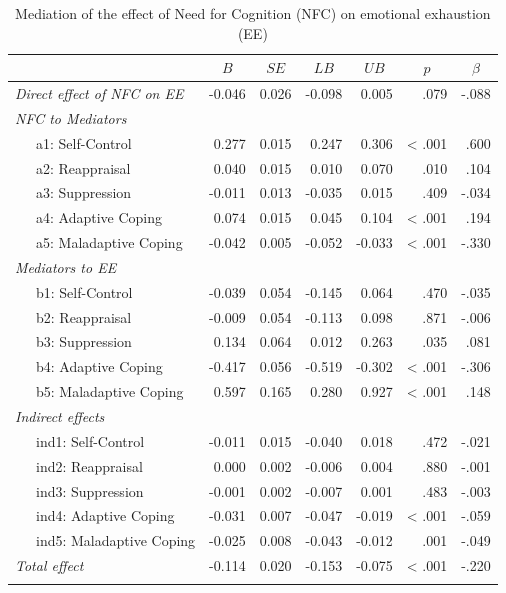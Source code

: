\documentclass[
  english,
  man]{apa6}
\begin{document}
\begin{table}[tbp]

\begin{center}
\begin{threeparttable}

\caption{\label{tab:RQ5}Mediation of the effect of Need for Cognition (NFC) on emotional exhaustion (EE)}

\footnotesize{

\begin{tabular}{lrrrrrr}
\toprule
 & \multicolumn{1}{c}{$B$} & \multicolumn{1}{c}{$SE$} & \multicolumn{1}{c}{$LB$} & \multicolumn{1}{c}{$UB$} & \multicolumn{1}{c}{$p$} & \multicolumn{1}{c}{$\beta$}\\
\midrule
\textit{Direct effect of NFC on EE} & -0.046 & 0.026 & -0.098 & 0.005 & .079 & -.088\\ \midrule
\textit{NFC to Mediators} &  &  &  &  &  & \\
\ \ \ a1: Self-Control & 0.277 & 0.015 & 0.247 & 0.306 & < .001 & .600\\
\ \ \ a2: Reappraisal & 0.040 & 0.015 & 0.010 & 0.070 & .010 & .104\\
\ \ \ a3: Suppression & -0.011 & 0.013 & -0.035 & 0.015 & .409 & -.034\\
\ \ \ a4: Adaptive Coping & 0.074 & 0.015 & 0.045 & 0.104 & < .001 & .194\\
\ \ \ a5: Maladaptive Coping & -0.042 & 0.005 & -0.052 & -0.033 & < .001 & -.330\\ \midrule
\textit{Mediators to EE} &  &  &  &  &  & \\
\ \ \ b1: Self-Control & -0.039 & 0.054 & -0.145 & 0.064 & .470 & -.035\\
\ \ \ b2: Reappraisal & -0.009 & 0.054 & -0.113 & 0.098 & .871 & -.006\\
\ \ \ b3: Suppression & 0.134 & 0.064 & 0.012 & 0.263 & .035 & .081\\
\ \ \ b4: Adaptive Coping & -0.417 & 0.056 & -0.519 & -0.302 & < .001 & -.306\\
\ \ \ b5: Maladaptive Coping & 0.597 & 0.165 & 0.280 & 0.927 & < .001 & .148\\ \midrule
\textit{Indirect effects} &  &  &  &  &  & \\
\ \ \ ind1: Self-Control & -0.011 & 0.015 & -0.040 & 0.018 & .472 & -.021\\
\ \ \ ind2: Reappraisal & 0.000 & 0.002 & -0.006 & 0.004 & .880 & -.001\\
\ \ \ ind3: Suppression & -0.001 & 0.002 & -0.007 & 0.001 & .483 & -.003\\
\ \ \ ind4: Adaptive Coping & -0.031 & 0.007 & -0.047 & -0.019 & < .001 & -.059\\
\ \ \ ind5: Maladaptive Coping & -0.025 & 0.008 & -0.043 & -0.012 & .001 & -.049\\ \midrule
\textit{Total effect} & -0.114 & 0.020 & -0.153 & -0.075 & < .001 & -.220\\
\bottomrule
\addlinespace
\end{tabular}

}
\end{threeparttable}
\end{center}
\end{table}
\end{document}
